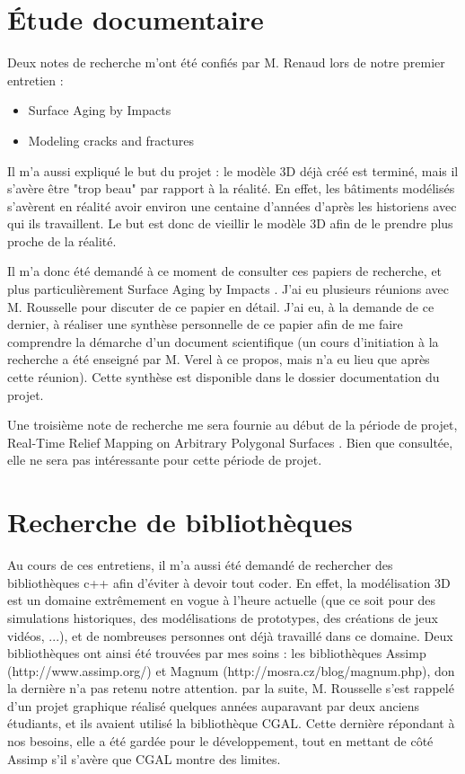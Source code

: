 \documentclass[a4paper,french]{report}
\begin{document}
		\section{Étude documentaire}
			Deux notes de recherche m'ont été confiés par M. Renaud lors de notre premier entretien : 
				\begin{itemize}
					\item Surface Aging by Impacts \cite{PPD01}
					\item Modeling cracks and fractures \cite{Liris-6004}
				\end{itemize}\par
			Il m'a aussi expliqué le but du projet : le modèle 3D déjà créé est terminé, mais il s'avère être "trop beau" par rapport à la réalité. En effet, les bâtiments modélisés s'avèrent en réalité avoir environ une centaine d'années d'après les historiens avec qui ils travaillent. Le but est donc de vieillir le modèle 3D afin de le prendre plus proche de la réalité. \par
			Il m'a donc été demandé à ce moment de consulter ces papiers de recherche, et plus particulièrement Surface Aging by Impacts \cite{PPD01}. J'ai eu plusieurs réunions avec M. Rousselle pour discuter de ce papier en détail. J'ai eu, à la demande de ce dernier, à réaliser une synthèse personnelle de ce papier afin de me faire comprendre la démarche d'un document scientifique (un cours d'initiation à la recherche a été enseigné par M. Verel à ce propos, mais n'a eu lieu que après cette réunion). Cette synthèse est disponible dans le dossier documentation du projet. \par
			Une troisième note de recherche me sera fournie au début de la période de projet, Real-Time Relief Mapping on Arbitrary Polygonal Surfaces \cite{Policarpo:2005:RRM:1053427.1053453}. Bien que consultée, elle ne sera pas intéressante pour cette période de projet.
			
		\section{Recherche de bibliothèques}
			Au cours de ces entretiens, il m'a aussi été demandé de rechercher des bibliothèques c++ afin d'éviter à devoir tout coder. En effet, la modélisation 3D est un domaine extrêmement en vogue à l'heure actuelle (que ce soit pour des simulations historiques, des modélisations de prototypes, des créations de jeux vidéos, ...), et de nombreuses personnes ont déjà travaillé dans ce domaine. Deux bibliothèques ont ainsi été trouvées par mes soins : les bibliothèques Assimp (http://www.assimp.org/) et Magnum (http://mosra.cz/blog/magnum.php), don la dernière n'a pas retenu notre attention. par la suite, M. Rousselle s'est rappelé d'un projet graphique réalisé quelques années auparavant par deux anciens étudiants, et ils avaient utilisé la bibliothèque CGAL. Cette dernière répondant à nos besoins, elle a été gardée pour le développement, tout en mettant de côté Assimp s'il s'avère que CGAL montre des limites. 
		
\end{document}
